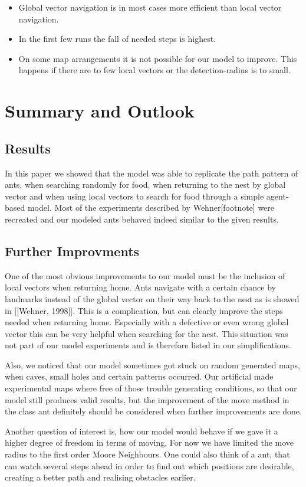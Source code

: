 \documentclass[11pt]{article}
\begin{document}
\begin{itemize}
\item Global vector navigation is in most cases more efficient than local vector navigation.
\item In the first few runs the fall of needed steps is highest.
\item On some map arrangements it is not possible for our model to improve. This happens if there are to few local vectors or the detection-radius is to small.
\end{itemize}

\newpage
\section{Summary and Outlook}
\subsection{Results}
In this paper we showed that the model was able to replicate the path pattern of ants, when searching randomly for food, when returning to the nest by global vector and when using local vectors to search for food through a simple agent-based model. Most of the experiments described by Wehner[footnote] were recreated and our modeled ants behaved indeed similar to the given results.
\subsection{Further Improvments}
One of the most obvious improvements to our model must be the inclusion of local vectors when returning home. Ants navigate with a certain chance by landmarks instead of the global vector on their way back to the nest as is showed in [[Wehner, 1998]]. This is a complication, but can clearly improve the steps needed when returning home. Especially with a defective or even wrong global vector this can be very helpful when searching for the nest. This situation was not part of our model experiments and is therefore listed in our simplifications.

Also, we noticed that our model sometimes got stuck on random generated maps, when caves, small holes and certain patterns occurred. Our artificial made experimental maps where free of those trouble generating conditions, so that our model still produces valid results, but the improvement of the move method in the class ant definitely should be considered when further improvements are done.

Another question of interest is, how our model would behave if we gave it a higher degree of freedom in terms of moving. For now we have limited the move radius to the first order Moore Neighbours. One could also think of a ant, that can watch several steps ahead in order to find out which positions are desirable, creating a better path and realising obstacles earlier.
\end{document}
